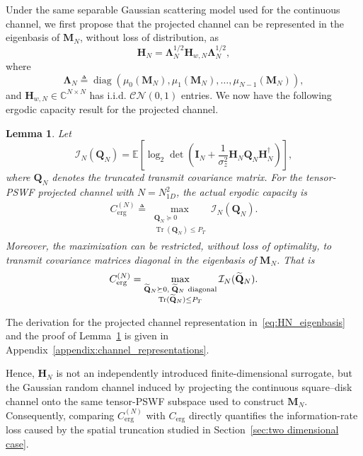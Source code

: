 \documentclass[lettersize,journal]{IEEEtran}
\theoremstyle{plain}
\newtheorem{lemma}{Lemma}
\begin{document}
Under the same separable Gaussian scattering model used for the
continuous channel, we first propose that the projected channel can be represented in the eigenbasis of $\mathbf{M}_N$, without loss of distribution, as 
\begin{equation}
	\mathbf{H}_N
	=
	\boldsymbol{\Lambda}_N^{1/2}
	\mathbf{H}_{w,N}
	\boldsymbol{\Lambda}_N^{1/2},
	\label{eq:HN_eigenbasis}
\end{equation}
where 
\begin{equation}
	\boldsymbol{\Lambda}_N
	\triangleq
	\operatorname{diag}
	\left(
	\mu_0(\mathbf{M}_N),
	\mu_1(\mathbf{M}_N),
	\ldots,
	\mu_{N-1}(\mathbf{M}_N)
	\right),
	\label{eq:Lambda_N_definition}
\end{equation}
and $\mathbf{H}_{w,N}\in\mathbb{C}^{N\times N}$ has i.i.d. $\mathcal{CN}(0,1)$ entries. We now have the following ergodic capacity result for the projected channel.
\begin{lemma}
	\label{lemma:truncated_capacity}
	Let $$\mathcal{I}_N(\mathbf{Q}_N) = \mathbb{E}
	\left[
	\log_2
	\det
	\left(
	\mathbf{I}_N
	+
	\frac{1}{\sigma_z^2}
	\mathbf{H}_N
	\mathbf{Q}_N
	\mathbf{H}_N^\dagger
	\right)
	\right], $$
	where $\mathbf{Q}_N$ denotes the truncated transmit covariance matrix.
	For the tensor-PSWF projected channel with $N=N_{1D}^2$, 
	the actual ergodic capacity is
	\begin{align}
		C_{\mathrm{erg}}^{(N)}
		\triangleq
		\max_{\substack{
				\mathbf{Q}_N\succeq0\\
				\operatorname{Tr}(\mathbf{Q}_N)\leq P_T
		}}
		\mathcal{I}_N(\mathbf{Q}_N).
		\label{eq:finite_ergodic_capacity}
	\end{align}
	Moreover, the maximization can be restricted, without loss of
	optimality, to transmit covariance matrices diagonal in the
	eigenbasis of $\mathbf{M}_N$. That is
	\begin{align}
		C_{\mathrm{erg}}^{(N)}
		= 
		\max_{\substack{
					\widetilde{\mathbf{Q}}_N\succeq0,\;
					\widetilde{\mathbf{Q}}_N\ {\rm diagonal}\\
					\operatorname{Tr}(\widetilde{\mathbf{Q}}_N)\leq P_T
		}}
		\mathcal{I}_N(\widetilde{\mathbf{Q}}_N).
		\label{eq:finite_capacity_diagonal_Q}
	\end{align}
\end{lemma}
The derivation for the projected channel representation in~\eqref{eq:HN_eigenbasis} and the proof of Lemma~\ref{lemma:truncated_capacity} is given in Appendix~\ref{appendix:channel_representations}.

Hence, $\mathbf{H}_N$ is not an independently introduced
finite-dimensional surrogate, but the Gaussian random channel induced
by projecting the continuous square--disk channel onto the same
tensor-PSWF subspace used to construct $\mathbf{M}_N$. Consequently,
comparing $C_{\mathrm{erg}}^{(N)}$ with $C_{\mathrm{erg}}$ directly
quantifies the information-rate loss caused by the spatial truncation
studied in Section~\ref{sec:two dimensional case}.
\end{document}
